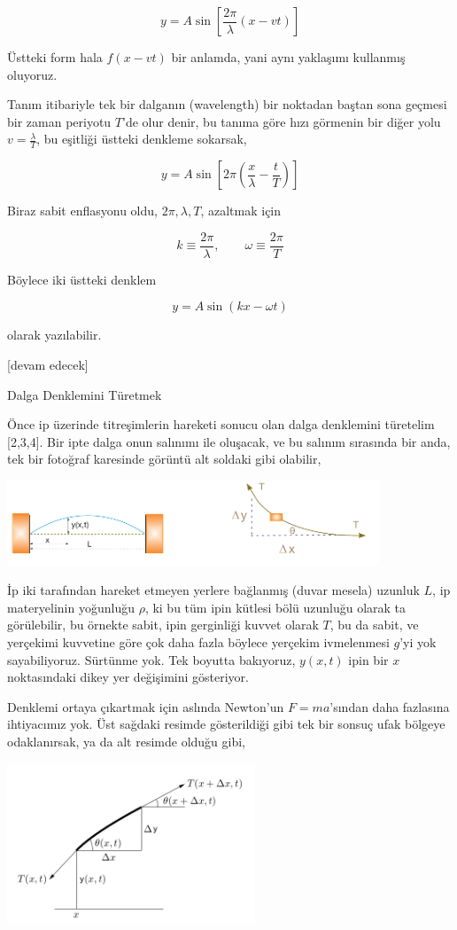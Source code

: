 \documentclass[12pt,fleqn]{article}\usepackage{../../common}
\begin{document}
$$
y = A \sin \left[ \frac{2\pi}{\lambda} (x - vt) \right]
$$

Üstteki form hala $f(x-vt)$ bir anlamda, yani aynı yaklaşımı kullanmış oluyoruz.

Tanım itibariyle tek bir dalganın (wavelength) bir noktadan baştan sona geçmesi
bir zaman periyotu $T$'de olur denir, bu tanıma göre hızı görmenin bir diğer
yolu $v = \frac{\lambda}{T}$, bu eşitliği üstteki denkleme sokarsak,

$$
y = A \sin \left[ 2\pi \left( \frac{x}{\lambda} - \frac{t}{T} \right) \right]
$$

Biraz sabit enflasyonu oldu, $2\pi,\lambda,T$, azaltmak için

$$
k \equiv \frac{2\pi}{\lambda}, \qquad 
\omega \equiv \frac{2\pi}{T}
$$

Böylece iki üstteki denklem

$$
y = A \sin(kx - \omega t)
$$

olarak yazılabilir.


[devam edecek]

Dalga Denklemini Türetmek

Önce ip üzerinde titreşimlerin hareketi sonucu olan dalga denklemini türetelim
[2,3,4]. Bir ipte dalga onun salınımı ile oluşacak, ve bu salınım sırasında bir
anda, tek bir fotoğraf karesinde görüntü alt soldaki gibi olabilir,

\includegraphics[width=30em]{compscieng_app17wave_01.png}

İp iki tarafından hareket etmeyen yerlere bağlanmış (duvar mesela) uzunluk $L$,
ip materyelinin yoğunluğu $\rho$, ki bu tüm ipin kütlesi bölü uzunluğu olarak ta
görülebilir, bu örnekte sabit, ipin gerginliği kuvvet olarak $T$, bu da sabit,
ve yerçekimi kuvvetine göre çok daha fazla böylece yerçekim ivmelenmesi $g$'yi
yok sayabiliyoruz. Sürtünme yok. Tek boyutta bakıyoruz, $y(x,t)$ ipin bir $x$
noktasındaki dikey yer değişimini gösteriyor.

Denklemi ortaya çıkartmak için aslında Newton'un $F=ma$'sından daha fazlasına
ihtiyacımız yok. Üst sağdaki resimde gösterildiği gibi tek bir sonsuç ufak
bölgeye odaklanırsak, ya da alt resimde olduğu gibi,

\includegraphics[width=20em]{compscieng_app17wave_02.png}
\end{document}
